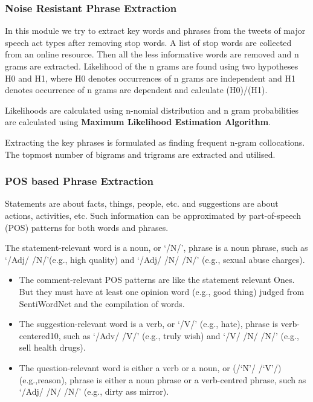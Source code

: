 \documentclass[conference]{IEEEtran}
\begin{document}
\subsubsection{\textbf{Noise Resistant Phrase Extraction}}
\par In this module we try to extract key words and phrases from the tweets of major speech act types after removing stop words. A list of stop words are collected from an online resource. Then all the less informative words are removed and n grams are extracted. Likelihood of the n grams are found using two hypotheses H0 and H1, where H0 denotes occurrences of n grams are independent and H1 denotes occurrence of n grams are dependent and calculate \log(H0)/\log(H1). 

\par Likelihoods are calculated using n-nomial distribution and n gram probabilities are calculated using \textbf{Maximum Likelihood Estimation Algorithm}.

\par Extracting the key phrases is formulated as finding frequent n-gram collocations. The topmost number of bigrams and trigrams are extracted and utilised.

\subsubsection{\textbf{POS based Phrase Extraction}}
\par Statements are about facts, things, people, etc. and suggestions are about actions, activities, etc. Such information can be approximated by part-of-speech (POS) patterns for both words and phrases.
 \par The statement-relevant word is a noun, or ‘/N/’, phrase is a noun phrase, such as ‘/Adj/ /N/’(e.g., high quality) and ‘/Adj/ /N/ /N/’ (e.g., sexual abuse charges).
\begin{itemize}
\item{The comment-relevant POS patterns are like the statement relevant
Ones. But they must have at least one opinion word (e.g., good thing) judged from SentiWordNet and the compilation of words.}
\item{The suggestion-relevant word is a verb, or ‘/V/’ (e.g., hate), phrase is verb-centered10, such as ‘/Adv/ /V/’ (e.g., truly wish) and ‘/V/ /N/ /N/’ (e.g., sell health drugs).}
\item{The question-relevant word is either a verb or a noun, or (/‘N’/ /‘V’/) (e.g.,reason), phrase is either a noun phrase or a verb-centred phrase, such as ‘/Adj/ /N/ /N/’ (e.g., dirty ass mirror).}
\end{itemize}
\end{document}
